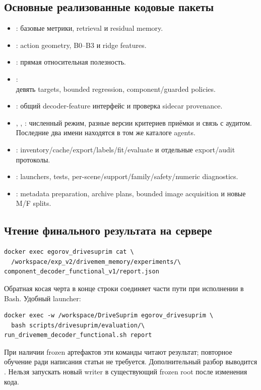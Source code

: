 \documentclass[11pt,a4paper]{article}
\begin{document}
\subsection{Основные реализованные кодовые пакеты}
\begin{itemize}
\item {}: базовые метрики, retrieval и residual memory.
\item {}: action geometry, B0--B3 и ridge features.
\item {}: прямая относительная полезность.
\item {}:\\
девять targets, bounded regression, component/guarded policies.
\item {}: общий decoder-feature интерфейс и проверка sidecar provenance.
\item {}, , : численный режим, разные версии критериев приёмки и связь с аудитом. Последние два имени находятся в том же каталоге agents.
\item {}: inventory/cache/export/labels/fit/evaluate и отдельные export/audit протоколы.
\item {}: launchers, tests, per-scene/support/family/safety/numeric diagnostics.
\item {}: metadata preparation, archive plans, bounded image acquisition и новые M/F splits.
\end{itemize}

\subsection{Чтение финального результата на сервере}
\begin{verbatim}
docker exec egorov_drivesuprim cat \
  /workspace/exp_v2/drivemem_memory/experiments/\
component_decoder_functional_v1/report.json
\end{verbatim}
Обратная косая черта в конце строки соединяет части пути при исполнении в Bash. Удобный launcher:
\begin{verbatim}
docker exec -w /workspace/DriveSuprim egorov_drivesuprim \
  bash scripts/drivesuprim/evaluation/\
run_drivemem_decoder_functional.sh report
\end{verbatim}
При наличии frozen артефактов эти команды читают результат; повторное обучение ради написания статьи не требуется. Дополнительный разбор выводится . Нельзя запускать новый writer в существующий frozen root после изменения кода.
\end{document}
